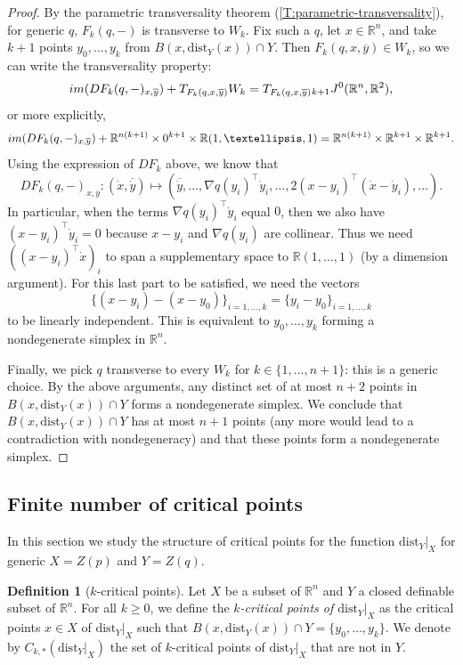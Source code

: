 \documentclass{amsart}
\newcommand{\R}{\mathbb{R}}
\newcommand{\dd}{\mathrm{dist}}
\newcommand{\dist}{{\mathrm{dist}_Y|_X}}
\theoremstyle{definition}
\newtheorem{definition}[subsubsection]{Definition}
\theoremstyle{remark}
\begin{document}
\begin{proof}
By the parametric transversality theorem (\cref{T:parametric-transversality}), for generic $q$, $F_k(q, -)$ is transverse to $W_k$. Fix such a $q$, let $x \in \R^n$, and take $k + 1$ points $y_0, \ldots, y_k$ from $B(x, \dd_Y(x)) \cap Y$. Then $F_k(q, x, \overline{y}) \in W_k$, so we can write the transversality property:
\[
\textnormal{im}(DF_k(q, -)_{x, \overline{y}}) + T_{F_k(q, x, \overline{y})} W_k = T_{F_k(q, x, \overline{y})} {}_{k + 1} J^0(\R^n, \R^2),
\]
or more explicitly,
\[
\textnormal{im}(DF_k(q, -)_{x, \overline{y}}) + \R^{n (k + 1)} \times 0^{k + 1} \times \R (1, \ldots, 1) = \R^{n (k + 1)} \times \R^{k + 1} \times \R^{k + 1}.
\]
Using the expression of $DF_k$ above, we know that
\[
DF_k(q, -)_{x, \overline{y}} \colon (\dot{x}, \overline{\dot{y}}) \mapsto (\overline{\dot{y}}, \ldots, \nabla q(y_i)^\top \dot{y}_i, \ldots, 2(x - y_i)^\top (\dot{x} - \dot{y}_i), \ldots).
\]
In particular, when the terms $\nabla q(y_i)^\top \dot{y}_i$ equal $0$, then we also have $(x - y_i)^\top \dot{y}_i = 0$ because $x - y_i$ and $\nabla q(y_i)$ are collinear. Thus we need $((x - y_i)^\top \dot{x})_i$ to span a supplementary space to $\R (1, \ldots, 1)$ (by a dimension argument). For this last part to be satisfied, we need the vectors
\[
\{(x - y_i) - (x - y_0)\}_{i = 1, \ldots, k} = \{y_i - y_0\}_{i = 1, \ldots ,k}
\]
to be linearly independent. This is equivalent to $y_0, \ldots, y_k$ forming a nondegenerate simplex in $\R^n$.

Finally, we pick $q$ transverse to every $W_k$ for $k \in \{1, \ldots, n + 1\}$: this is a generic choice. By the above arguments, any distinct set of at most $n + 2$ points in $B(x, \dd_Y(x)) \cap Y$ forms a nondegenerate simplex. We conclude that $B(x, \dd_Y(x)) \cap Y$ has at most $n + 1$ points (any more would lead to a contradiction with nondegeneracy) and that these points form a nondegenerate simplex.
\end{proof}

\subsection{Finite number of critical points}
In this section we study the structure of critical points for the function $\dist$ for generic $X = Z(p)$ and $Y = Z(q)$.

\begin{definition}[$k$-critical points]
\label{D:k-crit-pt}
Let $X$ be a subset of $\R^n$ and $Y$ a closed definable subset of $\R^n$. For all $k \geq 0$, we define the \emph{$k$-critical points of $\dist$} as the critical points $x \in X$ of $\dist$ such that  $B(x, \dd_Y(x)) \cap Y=\{y_0, \ldots, y_k\}$.
We denote by $C_{k, *}(\dist)$ the set of $k$-critical points of $\dist$ that are not in $Y$. 
\end{definition}
\end{document}
